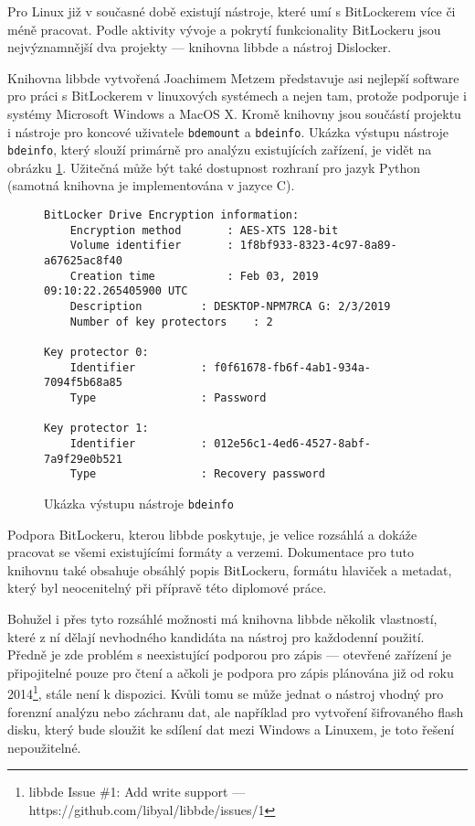 
Pro Linux již v současné době existují nástroje, které umí s BitLockerem více či méně pracovat. Podle aktivity vývoje a pokrytí funkcionality BitLockeru jsou nejvýznamnější dva projekty --- knihovna libbde\cite{Metz2018} a nástroj Dislocker\cite{Coltel2017}.


Knihovna libbde vytvořená Joachimem Metzem představuje asi nejlepší software pro práci s BitLockerem v linuxových systémech a nejen tam, protože podporuje i systémy Microsoft Windows a MacOS X\cite{Metz2016}. Kromě knihovny jsou součástí projektu i nástroje pro koncové uživatele \texttt{bdemount} a \texttt{bdeinfo}. Ukázka výstupu nástroje \texttt{bdeinfo}, který slouží primárně pro analýzu existujících zařízení, je vidět na obrázku \ref{fig:libbde-bdeinfo}. Užitečná může být také dostupnost rozhraní pro jazyk Python (samotná knihovna je implementována v jazyce C).

\begin{figure}[h]
		\centering
		\captionsetup{width=0.65\linewidth}
\begin{lstlisting}[frame=none, basicstyle=\ttfamily\small, columns=fullflexible, keepspaces=true]
BitLocker Drive Encryption information:
	Encryption method		: AES-XTS 128-bit
	Volume identifier		: 1f8bf933-8323-4c97-8a89-a67625ac8f40
	Creation time			: Feb 03, 2019 09:10:22.265405900 UTC
	Description			: DESKTOP-NPM7RCA G: 2/3/2019
	Number of key protectors	: 2

Key protector 0:
	Identifier			: f0f61678-fb6f-4ab1-934a-7094f5b68a85
	Type				: Password

Key protector 1:
	Identifier			: 012e56c1-4ed6-4527-8abf-7a9f29e0b521
	Type				: Recovery password
\end{lstlisting}
		\caption{Ukázka výstupu nástroje \texttt{bdeinfo}}
		\label{fig:libbde-bdeinfo}
\end{figure}

Podpora BitLockeru, kterou libbde poskytuje, je velice rozsáhlá a dokáže pracovat se všemi existujícími formáty a verzemi. Dokumentace pro tuto knihovnu také obsahuje obsáhlý popis BitLockeru, formátu hlaviček a metadat\cite{Metz2011}, který byl neocenitelný při přípravě této diplomové práce.

Bohužel i přes tyto rozsáhlé možnosti má knihovna libbde několik vlastností, které z ní dělají nevhodného kandidáta na nástroj pro každodenní použití. Předně je zde problém s neexistující podporou pro zápis --- otevřené zařízení je připojitelné pouze pro čtení a ačkoli je podpora pro zápis plánována již od roku 2014\footnote{libbde Issue \#1: Add write support --- https://github.com/libyal/libbde/issues/1}, stále není k dispozici. Kvůli tomu se může jednat o nástroj vhodný pro forenzní analýzu nebo záchranu dat, ale například pro vytvoření šifrovaného flash disku, který bude sloužit ke sdílení dat mezi Windows a Linuxem, je toto řešení nepoužitelné.

